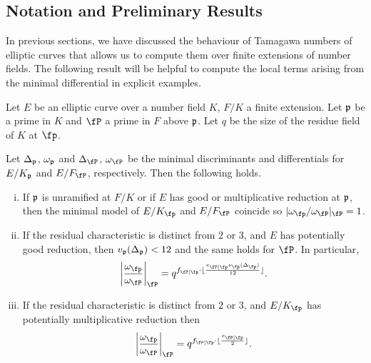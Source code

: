 \subsection{Notation and Preliminary Results}

In previous sections, we have discussed the behaviour of Tamagawa numbers of elliptic curves that allows us to compute them over finite extensions of number fields. The following result will be helpful to compute the local terms arising from the minimal differential in explicit examples.

    \begin{lemma}\label{lem_Dterms}
        Let $E$ be an elliptic curve over a number field $K$, $F/K$ a finite extension. Let $\mathfrak{p}$ be a prime in $K$ and $\fP$ a prime in $F$ above $\mathfrak{p}$. Let $q$ be the size of the residue field of $K$ at $\fp$. %

        Let $\Delta_{\mathfrak{p}}$, $\omega_{\mathfrak{p}}$ and $\Delta_\fP$, $\omega_{\fP}$ be the minimal discriminants and differentials for $E/K_{\mathfrak{p}}$ and $E/F_\fP$, respectively. Then the following holds.
        \begin{enumerate}[(i)]
            \setlength\itemsep{0em}
            \item If $\mathfrak{p}$ is unramified at $F/K$ or if $E$ has good or multiplicative reduction at $\mathfrak{p}$, then the minimal model of $E / K_{\fp}$ and $E / F_{\fP}$ coincide so $| \omega_{\fp} / \omega_{\fP} |_{\fP} = 1$. 
            
            \item If the residual characteristic is distinct from $2$ or $3$, and $E$ has potentially good reduction, then $v_{\mathfrak{p}}(\Delta_{\mathfrak{p}})<12$ and the same holds for $\fP$. In particular, 
            $$\left|\frac{\omega_{\fp}}{\omega_{\fP}}\right|_{\fP} = q^{f_{\fP \mid \fp}\cdot\floor{\frac{e_{\fP\mid\fp}\nu_\fp(\Delta_\fp)}{12}}}.$$
            \item If the residual characteristic is distinct from $2$ or $3$, and $E / K_{\fp}$ has potentially multiplicative reduction then 
            $$ \left|\frac{\omega_{\fp}}{\omega_{\fP}}\right|_{\fP} = q^{f_{\fP \mid \fp} \cdot \floor{\frac{e_{\fP \mid \fp}}{2}}}.$$
        \end{enumerate}
    \end{lemma}

